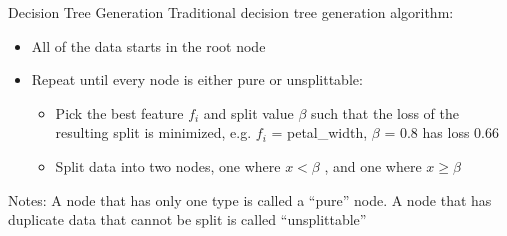 \documentclass[aspectratio=169]{../latex_main/tntbeamer}  %
\begin{document}
	
	\begin{frame}{Decision Tree Generation}
	    Traditional decision tree generation algorithm: 
	    \begin{itemize}
	        \item All of the data starts in the root node
	        \item Repeat until every node is either pure or unsplittable:
	        \begin{itemize}
	            \item Pick the best feature $f_i$ and split value $\beta$ such that the loss of the resulting split is minimized, e.g. $f_i$ = petal\_width, $\beta$ = 0.8 has loss 0.66
	            \item Split data into two nodes, one where $x < \beta$ , and one where $x \geq \beta$ 
	        \end{itemize}
	    \end{itemize}
	    Notes: A node that has only one type is called a “pure” node. A node that has duplicate data that cannot be split is called “unsplittable” \\

	\end{frame}
\end{document}
